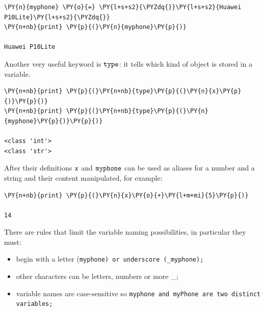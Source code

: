 \begin{tcolorbox}[breakable, size=fbox, boxrule=1pt, pad at break*=1mm, colback=cellbackground, colframe=cellborder]
\begin{Verbatim}[commandchars=\\\{\}]
\PY{n}{myphone} \PY{o}{=} \PY{l+s+s2}{\PYZdq{}}\PY{l+s+s2}{Huawei P10Lite}\PY{l+s+s2}{\PYZdq{}}
\PY{n+nb}{print} \PY{p}{(}\PY{n}{myphone}\PY{p}{)}

Huawei P10Lite
\end{Verbatim}
\end{tcolorbox}

Another very useful keyword is \(\tt{type}\): it tells which kind of object is stored in a variable.

\begin{tcolorbox}[breakable, size=fbox, boxrule=1pt, pad at break*=1mm, colback=cellbackground, colframe=cellborder]
\begin{Verbatim}[commandchars=\\\{\}]
\PY{n+nb}{print} \PY{p}{(}\PY{n+nb}{type}\PY{p}{(}\PY{n}{x}\PY{p}{)}\PY{p}{)}
\PY{n+nb}{print} \PY{p}{(}\PY{n+nb}{type}\PY{p}{(}\PY{n}{myphone}\PY{p}{)}\PY{p}{)}

<class 'int'>
<class 'str'>
\end{Verbatim}
\end{tcolorbox}

After their definitions \(\tt{x}\) and \(\tt{myphone}\) can be used as aliases for a number and a string and their content manipulated, for example:

\begin{tcolorbox}[breakable, size=fbox, boxrule=1pt, pad at break*=1mm, colback=cellbackground, colframe=cellborder]
\begin{Verbatim}[commandchars=\\\{\}]
\PY{n+nb}{print} \PY{p}{(}\PY{n}{x}\PY{o}{+}\PY{l+m+mi}{5}\PY{p}{)}

14
\end{Verbatim}
\end{tcolorbox}

There are rules that limit the variable naming possibilities, in particular they must:
\begin{itemize}
\item begin with a letter (\tt{myphone}) or underscore (\tt{\_myphone});
\item other characters can be letters, numbers or more \_;
\item variable names are case-sensitive so \tt{myphone} and \tt{myPhone} are two distinct variables;
\end{itemize}

